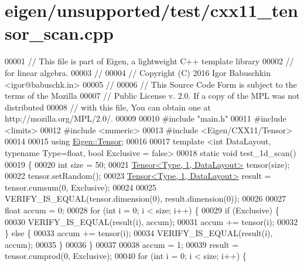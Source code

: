 \hypertarget{eigen_2unsupported_2test_2cxx11__tensor__scan_8cpp_source}{}\section{eigen/unsupported/test/cxx11\+\_\+tensor\+\_\+scan.cpp}
\label{eigen_2unsupported_2test_2cxx11__tensor__scan_8cpp_source}

\begin{DoxyCode}
00001 \textcolor{comment}{// This file is part of Eigen, a lightweight C++ template library}
00002 \textcolor{comment}{// for linear algebra.}
00003 \textcolor{comment}{//}
00004 \textcolor{comment}{// Copyright (C) 2016 Igor Babuschkin <igor@babuschk.in>}
00005 \textcolor{comment}{//}
00006 \textcolor{comment}{// This Source Code Form is subject to the terms of the Mozilla}
00007 \textcolor{comment}{// Public License v. 2.0. If a copy of the MPL was not distributed}
00008 \textcolor{comment}{// with this file, You can obtain one at http://mozilla.org/MPL/2.0/.}
00009 
00010 \textcolor{preprocessor}{#include "main.h"}
00011 \textcolor{preprocessor}{#include <limits>}
00012 \textcolor{preprocessor}{#include <numeric>}
00013 \textcolor{preprocessor}{#include <Eigen/CXX11/Tensor>}
00014 
00015 \textcolor{keyword}{using} \hyperlink{class_eigen_1_1_tensor}{Eigen::Tensor};
00016 
00017 \textcolor{keyword}{template} <\textcolor{keywordtype}{int} DataLayout, \textcolor{keyword}{typename} Type=\textcolor{keywordtype}{float}, \textcolor{keywordtype}{bool} Exclusive = false>
00018 \textcolor{keyword}{static} \textcolor{keywordtype}{void} test\_1d\_scan()
00019 \{
00020   \textcolor{keywordtype}{int} size = 50;
00021   \hyperlink{class_eigen_1_1_tensor}{Tensor<Type, 1, DataLayout>} tensor(size);
00022   tensor.setRandom();
00023   \hyperlink{class_eigen_1_1_tensor}{Tensor<Type, 1, DataLayout>} result = tensor.cumsum(0, Exclusive);
00024 
00025   VERIFY\_IS\_EQUAL(tensor.dimension(0), result.dimension(0));
00026 
00027   \textcolor{keywordtype}{float} accum = 0;
00028   \textcolor{keywordflow}{for} (\textcolor{keywordtype}{int} i = 0; i < size; i++) \{
00029     \textcolor{keywordflow}{if} (Exclusive) \{
00030       VERIFY\_IS\_EQUAL(result(i), accum);
00031       accum += tensor(i);
00032     \} \textcolor{keywordflow}{else} \{
00033       accum += tensor(i);
00034       VERIFY\_IS\_EQUAL(result(i), accum);
00035     \}
00036   \}
00037 
00038   accum = 1;
00039   result = tensor.cumprod(0, Exclusive);
00040   \textcolor{keywordflow}{for} (\textcolor{keywordtype}{int} i = 0; i < size; i++) \{

\end{DoxyCode}
